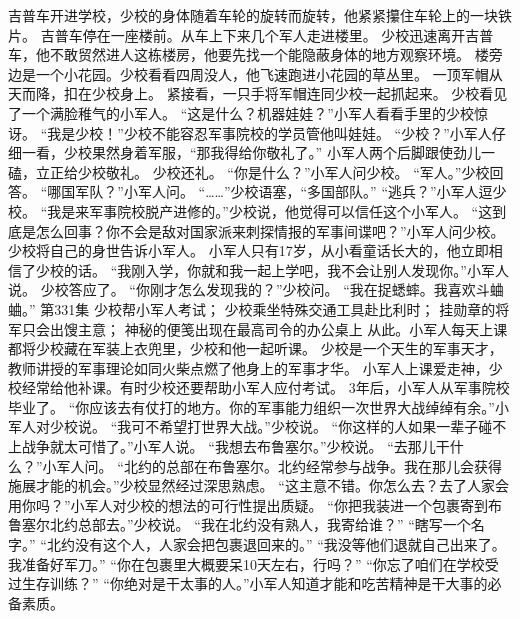 \documentclass[a4paper,12pt,UTF8,twoside]{ctexbook}
\begin{document}
        吉普车开进学校，少校的身体随着车轮的旋转而旋转，他紧紧攥住车轮上的一块铁片。  
        吉普车停在一座楼前。从车上下来几个军人走进楼里。  
        少校迅速离开吉普车，他不敢贸然进人这栋楼房，他要先找一个能隐蔽身体的地方观察环境。  
        楼旁边是一个小花园。少校看看四周没人，他飞速跑进小花园的草丛里。  
        一顶军帽从天而降，扣在少校身上。  
        紧接看，一只手将军帽连同少校一起抓起来。  
        少校看见了一个满脸稚气的小军人。  
        “这是什么？机器娃娃？”小军人看看手里的少校惊讶。  
        “我是少校！”少校不能容忍军事院校的学员管他叫娃娃。  
        “少校？”小军人仔细一看，少校果然身着军服，“那我得给你敬礼了。”  
        小军人两个后脚跟使劲儿一磕，立正给少校敬礼。  
        少校还礼。  
        “你是什么？”小军人问少校。  
        “军人。”少校回答。  
        “哪国军队？”小军人问。  
        “……”少校语塞，“多国部队。”  
        “逃兵？”小军人逗少校。  
        “我是来军事院校脱产进修的。”少校说，他觉得可以信任这个小军人。  
        “这到底是怎么回事？你不会是敌对国家派来刺探情报的军事间谍吧？”小军人问少校。  
        少校将自己的身世告诉小军人。  
        小军人只有17岁，从小看童话长大的，他立即相信了少校的话。  
        “我刚入学，你就和我一起上学吧，我不会让别人发现你。”小军人说。  
        少校答应了。  
        “你刚才怎么发现我的？”少校问。  
        “我在捉蟋蟀。我喜欢斗蛐蛐。”          第331集  
        少校帮小军人考试；  
        少校乘坐特殊交通工具赴比利时；  
        挂勋章的将军只会出馊主意；  
        神秘的便笺出现在最高司令的办公桌上  
        从此。小军人每天上课都将少校藏在军装上衣兜里，少校和他一起听课。  
        少校是一个天生的军事天才，教师讲授的军事理论如同火柴点燃了他身上的军事才华。  
        小军人上课爱走神，少校经常给他补课。有时少校还要帮助小军人应付考试。  
        3年后，小军人从军事院校毕业了。  
        “你应该去有仗打的地方。你的军事能力组织一次世界大战绰绰有余。”小军人对少校说。  
        “我可不希望打世界大战。”少校说。   
        “你这样的人如果一辈子碰不上战争就太可惜了。”小军人说。  
        “我想去布鲁塞尔。”少校说。  
        “去那儿干什么？”小军人问。  
        “北约的总部在布鲁塞尔。北约经常参与战争。我在那儿会获得施展才能的机会。”少校显然经过深思熟虑。  
        “这主意不错。你怎么去？去了人家会用你吗？”小军人对少校的想法的可行性提出质疑。  
        “你把我装进一个包裹寄到布鲁塞尔北约总部去。”少校说。  
        “我在北约没有熟人，我寄给谁？”  
        “瞎写一个名字。”  
        “北约没有这个人，人家会把包裹退回来的。”  
        “我没等他们退就自己出来了。我准备好军刀。”  
        “你在包裹里大概要呆10天左右，行吗？”  
        “你忘了咱们在学校受过生存训练？”  
        “你绝对是干太事的人。”小军人知道才能和吃苦精神是干大事的必备素质。  
\end{document}

